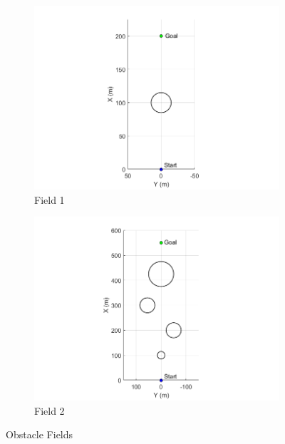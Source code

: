 \documentclass[12pt,onecolumn]{report}
\begin{document}
\begin{figure}
	\centering
	\begin{subfigure}[b]{0.49\columnwidth}
		\centering
		\includegraphics[width=\textwidth]{Figs/ObstacleField1.png}
		\caption{{\small Field 1}}   
		\label{fig:Obst1}
	\end{subfigure}
	\hfill
	\begin{subfigure}[b]{0.49\columnwidth}
		\centering
		\includegraphics[width=\columnwidth]{Figs/ObstacleField2.png}
		\caption{\small Field 2}   
		\label{fig:Obst2}
	\end{subfigure}
	\caption{\small Obstacle Fields}
	\label{fig:Obst}
\end{figure}
\end{document}
